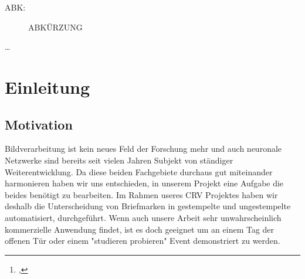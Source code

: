 \documentclass[12pt,toc=bib,toc=listof]{scrreprt}
\title{\reprttopic}
\author{\reprtstudentname\footnote{\reprtstudentid, \reprtstudentmail}}
\renewcommand*{\figurename}{Abb.}
\begin{document}
\renewcommand*{\figurename}{Abb.}
\maketitle
{}

\tableofcontents

\label{sec:listofabbrv}

\label{sec:abkuerzungsverzeichnis}

\begin{description}
  \item[ABK:] ABKÜRZUNG 
\end{description}


\onehalfspacing

\label{cha:management_summary}
\ldots

\newpage
{}

\chapter{Einleitung} %
\label{sec:einleitung}

\section{Motivation} %
\label{sec:motivation}

Bildverarbeitung ist kein neues Feld der Forschung mehr und auch neuronale Netzwerke sind bereits seit vielen Jahren Subjekt von ständiger Weiterentwicklung. Da diese beiden Fachgebiete durchaus gut miteinander harmonieren haben wir uns entschieden, in unserem Projekt eine Aufgabe die beides benötigt zu bearbeiten. Im Rahmen useres CRV Projektes haben wir deshalb die Unterscheidung von Briefmarken in gestempelte und ungestempelte automatisiert, durchgeführt. Wenn auch unsere Arbeit sehr unwahrscheinlich kommerzielle Anwendung findet, ist es doch geeignet um an einem Tag der offenen Tür oder einem "studieren probieren" Event demonstriert zu werden.

\end{document}
